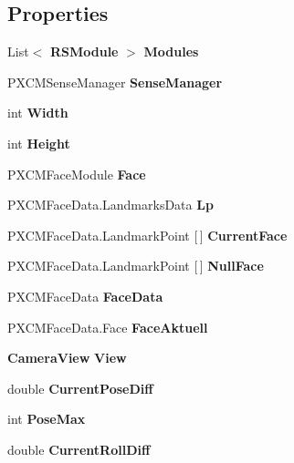 \subsection*{Properties}
\begin{DoxyCompactItemize}
\item 
List$<$ \textbf{ R\+S\+Module} $>$ \textbf{ Modules}\hspace{0.3cm}{\ttfamily  [get]}
\item 
P\+X\+C\+M\+Sense\+Manager \textbf{ Sense\+Manager}\hspace{0.3cm}{\ttfamily  [get, set]}
\item 
int \textbf{ Width}\hspace{0.3cm}{\ttfamily  [get]}
\item 
int \textbf{ Height}\hspace{0.3cm}{\ttfamily  [get]}
\item 
P\+X\+C\+M\+Face\+Module \textbf{ Face}\hspace{0.3cm}{\ttfamily  [get]}
\item 
P\+X\+C\+M\+Face\+Data.\+Landmarks\+Data \textbf{ Lp}\hspace{0.3cm}{\ttfamily  [get, set]}
\item 
P\+X\+C\+M\+Face\+Data.\+Landmark\+Point [$\,$] \textbf{ Current\+Face}\hspace{0.3cm}{\ttfamily  [get, set]}
\item 
P\+X\+C\+M\+Face\+Data.\+Landmark\+Point [$\,$] \textbf{ Null\+Face}\hspace{0.3cm}{\ttfamily  [get, set]}
\item 
P\+X\+C\+M\+Face\+Data \textbf{ Face\+Data}\hspace{0.3cm}{\ttfamily  [get, set]}
\item 
P\+X\+C\+M\+Face\+Data.\+Face \textbf{ Face\+Aktuell}\hspace{0.3cm}{\ttfamily  [get, set]}
\item 
\textbf{ Camera\+View} \textbf{ View}\hspace{0.3cm}{\ttfamily  [get, set]}
\item 
double \textbf{ Current\+Pose\+Diff}\hspace{0.3cm}{\ttfamily  [get, set]}
\item 
int \textbf{ Pose\+Max}\hspace{0.3cm}{\ttfamily  [get, set]}
\item 
double \textbf{ Current\+Roll\+Diff}\hspace{0.3cm}{\ttfamily  [get, set]}
\item 

\end{DoxyCompactItemize}
